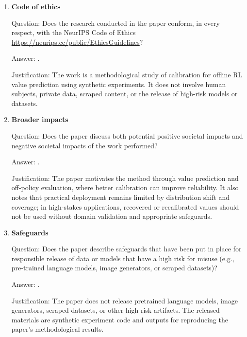 \documentclass{article}
\theoremstyle{plain}
\theoremstyle{definition}
\theoremstyle{remark}
\begin{document}
\begin{enumerate}[leftmargin=5mm]
Justification: The experiments are synthetic offline-RL simulations using
linear, random-feature, boosted-tree, and modest neural value learners; they do
not require pretrained foundation models or large-scale distributed training.
The paper gives the sample sizes, model sizes, iterations, and replication
counts needed to assess computational scale, and the accompanying code archive
documents the executable configurations.

\item \textbf{Code of ethics}

Question: Does the research conducted in the paper conform, in every respect,
with the NeurIPS Code of Ethics
\url{https://neurips.cc/public/EthicsGuidelines}?

Answer: \answerYes{}.

Justification: The work is a methodological study of calibration for offline RL
value prediction using synthetic experiments. It does not involve human
subjects, private data, scraped content, or the release of high-risk models or
datasets.

\item \textbf{Broader impacts}

Question: Does the paper discuss both potential positive societal impacts and
negative societal impacts of the work performed?

Answer: \answerYes{}.

Justification: The paper motivates the method through value prediction and
off-policy evaluation, where better calibration can improve reliability. It also
notes that practical deployment remains limited by distribution shift and
coverage; in high-stakes applications, recovered or recalibrated values should
not be used without domain validation and appropriate safeguards.

\item \textbf{Safeguards}

Question: Does the paper describe safeguards that have been put in place for
responsible release of data or models that have a high risk for misuse (e.g.,
pre-trained language models, image generators, or scraped datasets)?

Answer: \answerNA{}.

Justification: The paper does not release pretrained language models, image
generators, scraped datasets, or other high-risk artifacts. The released
materials are synthetic experiment code and outputs for reproducing the paper's
methodological results.


\end{enumerate}
\end{document}
